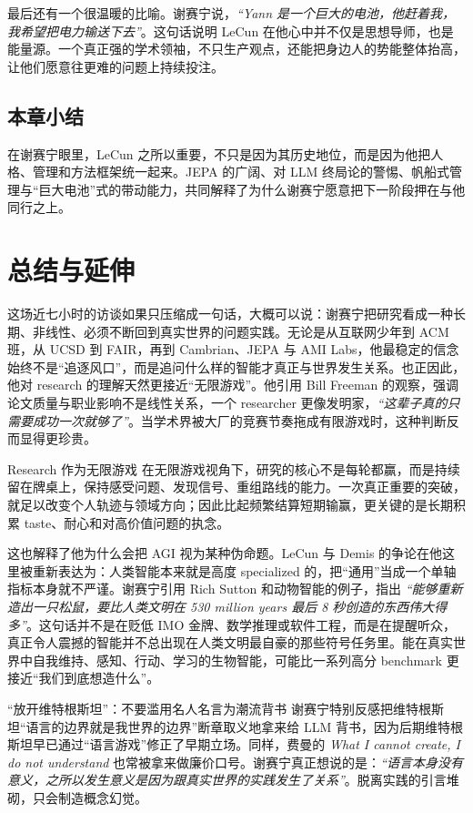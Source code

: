 \documentclass[a4paper,12pt]{article}
\begin{document}
最后还有一个很温暖的比喻。谢赛宁说，\textit{``Yann 是一个巨大的电池，他赶着我，我希望把电力输送下去''}。这句话说明 LeCun 在他心中并不仅是思想导师，也是能量源。一个真正强的学术领袖，不只生产观点，还能把身边人的势能整体抬高，让他们愿意往更难的问题上持续投注。

\subsection{本章小结}

在谢赛宁眼里，LeCun 之所以重要，不只是因为其历史地位，而是因为他把人格、管理和方法框架统一起来。JEPA 的广阔、对 LLM 终局论的警惕、帆船式管理与“巨大电池”式的带动能力，共同解释了为什么谢赛宁愿意把下一阶段押在与他同行之上。

\section{总结与延伸}

这场近七小时的访谈如果只压缩成一句话，大概可以说：谢赛宁把研究看成一种长期、非线性、必须不断回到真实世界的问题实践。无论是从互联网少年到 ACM 班，从 UCSD 到 FAIR，再到 Cambrian、JEPA 与 AMI Labs，他最稳定的信念始终不是“追逐风口”，而是追问什么样的智能才真正与世界发生关系。也正因此，他对 research 的理解天然更接近“无限游戏”。他引用 Bill Freeman 的观察，强调论文质量与职业影响不是线性关系，一个 researcher 更像发明家，\textit{``这辈子真的只需要成功一次就够了''}。当学术界被大厂的竞赛节奏拖成有限游戏时，这种判断反而显得更珍贵。

\begin{importantbox}{Research 作为无限游戏}
在无限游戏视角下，研究的核心不是每轮都赢，而是持续留在牌桌上，保持感受问题、发现信号、重组路线的能力。一次真正重要的突破，就足以改变个人轨迹与领域方向；因此比起频繁结算短期输赢，更关键的是长期积累 taste、耐心和对高价值问题的执念。
\end{importantbox}

这也解释了他为什么会把 AGI 视为某种伪命题。LeCun 与 Demis 的争论在他这里被重新表达为：人类智能本来就是高度 specialized 的，把“通用”当成一个单轴指标本身就不严谨。谢赛宁引用 Rich Sutton 和动物智能的例子，指出 \textit{``能够重新造出一只松鼠，要比人类文明在 530 million years 最后 8 秒创造的东西伟大得多''}。这句话并不是在贬低 IMO 金牌、数学推理或软件工程，而是在提醒听众，真正令人震撼的智能并不总出现在人类文明最自豪的那些符号任务里。能在真实世界中自我维持、感知、行动、学习的生物智能，可能比一系列高分 benchmark 更接近“我们到底想造什么”。

\begin{warningbox}{“放开维特根斯坦”：不要滥用名人名言为潮流背书}
谢赛宁特别反感把维特根斯坦“语言的边界就是我世界的边界”断章取义地拿来给 LLM 背书，因为后期维特根斯坦早已通过“语言游戏”修正了早期立场。同样，费曼的 \textit{What I cannot create, I do not understand} 也常被拿来做廉价口号。谢赛宁真正想说的是：\textit{``语言本身没有意义，之所以发生意义是因为跟真实世界的实践发生了关系''}。脱离实践的引言堆砌，只会制造概念幻觉。
\end{warningbox}
\end{document}
